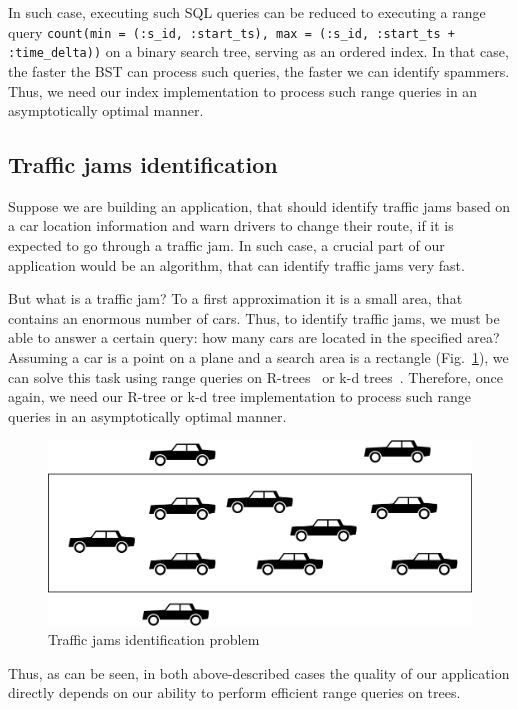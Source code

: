 \documentclass[times, dvipsnames,%
               languages={russian,english} %
              ]{itmo-student-thesis}
\begin{document}
In such case, executing such SQL queries can be reduced to executing a range query \texttt{count(min = (:s\_id, :start\_ts), max = (:s\_id, :start\_ts + :time\_delta))} on a binary search tree, serving as an ordered index. In that case, the faster the BST can process such queries, the faster we can identify spammers. Thus, we need our index implementation to process such range queries in an asymptotically optimal manner.

\subsection{Traffic jams identification}

Suppose we are building an application, that should identify traffic jams based on a car location information and warn drivers to change their route, if it is expected to go through a traffic jam. In such case, a crucial part of our application would be an algorithm, that can identify traffic jams very fast.

But what is a traffic jam? To a first approximation it is a small area, that contains an enormous number of cars. Thus, to identify traffic jams, we must be able to answer a certain query: how many cars are located in the specified area? Assuming a car is a point on a plane and a search area is a rectangle (Fig.~\ref{cars-area}), we can solve this task using range queries on R-trees~\cite{guttman1984r} or k-d trees~\cite{de2000computational}. Therefore, once again, we need our R-tree or k-d tree implementation to process such range queries in an asymptotically optimal manner.

\begin{figure}[H]
  \centering
  \caption{Traffic jams identification problem}
  \label{cars-area}
  \includegraphics[width=\linewidth]{pics/cars-area.png}
\end{figure}

Thus, as can be seen, in both above-described cases the quality of our application directly depends on our ability to perform efficient range queries on trees.
\end{document}
